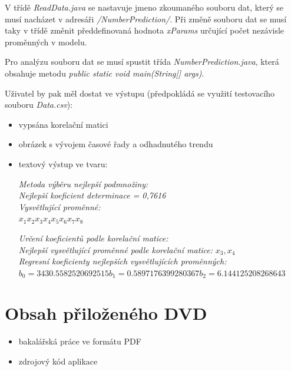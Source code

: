 \documentclass[a4paper,12pt,twoside]{scrreprt}
\begin{document}
V třídě \textit{ReadData.java} se nastavuje jmeno zkoumaného souboru dat, který se musí nacházet v adresáři \textit{/NumberPrediction/}. Při změně souboru dat se musí taky v třídě změnit předdefinovaná hodnota \textit{xParams} určující počet nezávisle proměnných v modelu. 

Pro analýzu souboru dat se musí spustit třída \textit{NumberPrediction.java}, která obsahuje metodu \textit{public static void main(String[] args)}. 

Uživatel by pak měl dostat ve výstupu (předpokládá se využití testovacího souboru \textit{Data.csv}):

\begin{itemize}
\item vypsána korelační matici 
\item obrázek s vývojem časové řady a odhadnutého trendu
\item textový výstup ve tvaru:

\textit{Metoda výběru nejlepší podmnožiny:} \\
\textit{Nejlepší koeficient determinace = 0,7616} \\
\textit{Vysvětlující proměnné:} \\
$x_1 x_2 x_3 x_4 x_5 x_6 x_7 x_8$

\textit{Určení koeficientů podle korelační matice:} \\
\textit{Nejlepší vysvětlující proměnné podle korelační matice:} $x_3, x_4$ \\
\textit{Regresní koeficienty nejlepších vysvětlujících proměnných:} \\
$b_0 = 3430.5582520692515 b_1 = 0.5897176399280367 b_2 = 6.144125208268643$
\end{itemize}

\chapter{Obsah přiloženého DVD}

\begin{itemize}
\item bakalářská práce ve formátu PDF
\item zdrojový kód aplikace
\end{itemize}
\end{document}

